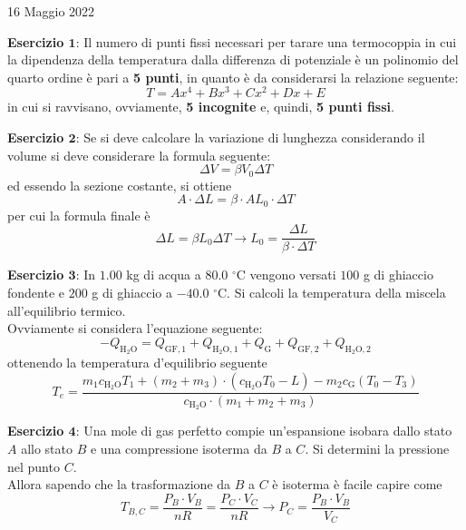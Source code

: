 \documentclass[a4paper]{extarticle}
\begin{document}
\newpage
\noindent
\begin{center}
  16 Maggio 2022
\end{center}
\textbf{Esercizio $\boldsymbol{1}$}: Il numero di punti fissi necessari per tarare una termocoppia in cui la dipendenza della temperatura dalla differenza di potenziale è un polinomio del quarto ordine è pari a \textbf{5 punti}, in quanto è da considerarsi la relazione seguente:
\[T=Ax^4 + Bx^3 + Cx^2 + Dx + E\]
in cui si ravvisano, ovviamente, \textbf{5 incognite} e, quindi, \textbf{5 punti fissi}.

\vspace{1em}
\noindent
\textbf{Esercizio $\boldsymbol{2}$}: Se si deve calcolare la variazione di lunghezza considerando il volume si deve considerare la formula seguente:
\[\Delta V = \beta V_0 \Delta T\]
ed essendo la sezione costante, si ottiene
\[A \cdot \Delta L = \beta \cdot A L_0 \cdot \Delta T\]
per cui la formula finale è
\[\Delta L = \beta L_0 \Delta T \longrightarrow L_0 = \frac{\Delta L}{\beta \cdot \Delta T}\]

\vspace{1em}
\noindent
\textbf{Esercizio $\boldsymbol{3}$}: In $1.00$ kg di acqua a $80.0$ $^\circ$C vengono versati $100$ g di ghiaccio fondente e $200$ g di ghiaccio a $-40.0$ $^\circ$C. Si calcoli la temperatura della miscela all’equilibrio termico.\\
Ovviamente si considera l'equazione seguente:
\[-Q_{\text{H}_2\text{O}} = Q_{\text{GF},1} + Q_{\text{H}_2\text{O},1} + Q_{\text{G}} + Q_{\text{GF},2} + Q_{\text{H}_2\text{O},2}\]
ottenendo la temperatura d'equilibrio seguente
\[T_e = \frac{m_1 c_{\text{H}_2\text{O}} T_1 + (m_2 + m_3) \cdot (c_{\text{H}_2\text{O}} T_0 - L) - m_2 c_{\text{G}} (T_0 - T_3)}{c_{\text{H}_2\text{O}} \cdot (m_1 + m_2 + m_3)}\]

\vspace{1em}
\noindent
\textbf{Esercizio $\boldsymbol{4}$}: Una mole di gas perfetto compie un'espansione isobara dallo stato $A$ allo stato $B$ e una compressione isoterma da $B$ a $C$. Si determini la pressione nel punto $C$.\\
Allora sapendo che la trasformazione da $B$ a $C$ è isoterma è facile capire come
\[T_{B,C} = \frac{P_B \cdot V_B}{n R} = \frac{P_C \cdot V_C}{n R} \longrightarrow P_{C} = \frac{P_B \cdot V_B}{V_C}\]

\newpage
\end{document}
